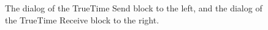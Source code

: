 \documentclass[final,twoside]{rapport}
\begin{document}
\begin{figure}
  \centerline{
  }
  \caption{The dialog of the TrueTime Send block to the left, and the
    dialog of the TrueTime Receive block to the right.}
  \label{fig:ttgetmsgmask}
\end{figure}
\end{document}
